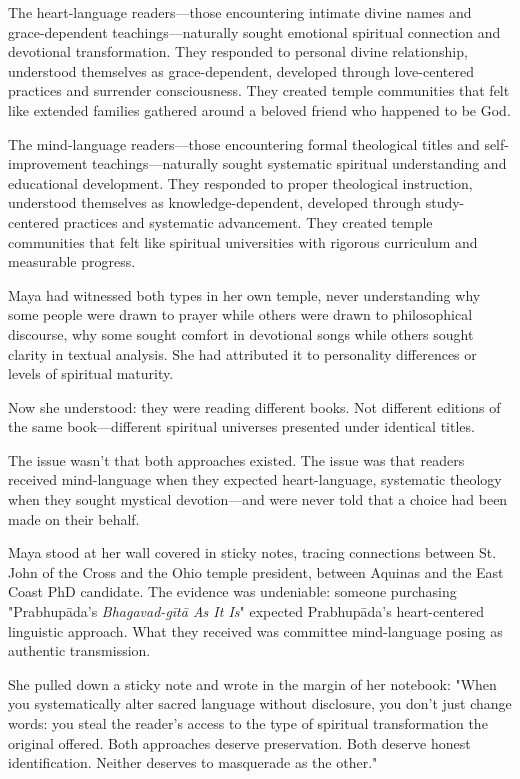 \documentclass[12pt,twoside]{book}
\begin{document}
The heart-language readers—those encountering intimate divine names and grace-dependent teachings—naturally sought emotional spiritual connection and devotional transformation. They responded to personal divine relationship, understood themselves as grace-dependent, developed through love-centered practices and surrender consciousness. They created temple communities that felt like extended families gathered around a beloved friend who happened to be God.

The mind-language readers—those encountering formal theological titles and self-improvement teachings—naturally sought systematic spiritual understanding and educational development. They responded to proper theological instruction, understood themselves as knowledge-dependent, developed through study-centered practices and systematic advancement. They created temple communities that felt like spiritual universities with rigorous curriculum and measurable progress.

Maya had witnessed both types in her own temple, never understanding why some people were drawn to prayer while others were drawn to philosophical discourse, why some sought comfort in devotional songs while others sought clarity in textual analysis. She had attributed it to personality differences or levels of spiritual maturity.

Now she understood: they were reading different books. Not different editions of the same book—different spiritual universes presented under identical titles.

The issue wasn't that both approaches existed. The issue was that readers received mind-language when they expected heart-language, systematic theology when they sought mystical devotion—and were never told that a choice had been made on their behalf.

Maya stood at her wall covered in sticky notes, tracing connections between St. John of the Cross and the Ohio temple president, between Aquinas and the East Coast PhD candidate. The evidence was undeniable: someone purchasing "Prabhupāda's \emph{Bhagavad-gītā As It Is}" expected Prabhupāda's heart-centered linguistic approach. What they received was committee mind-language posing as authentic transmission.

She pulled down a sticky note and wrote in the margin of her notebook: "When you systematically alter sacred language without disclosure, you don't just change words: you steal the reader's access to the type of spiritual transformation the original offered. Both approaches deserve preservation. Both deserve honest identification. Neither deserves to masquerade as the other."
\end{document}

